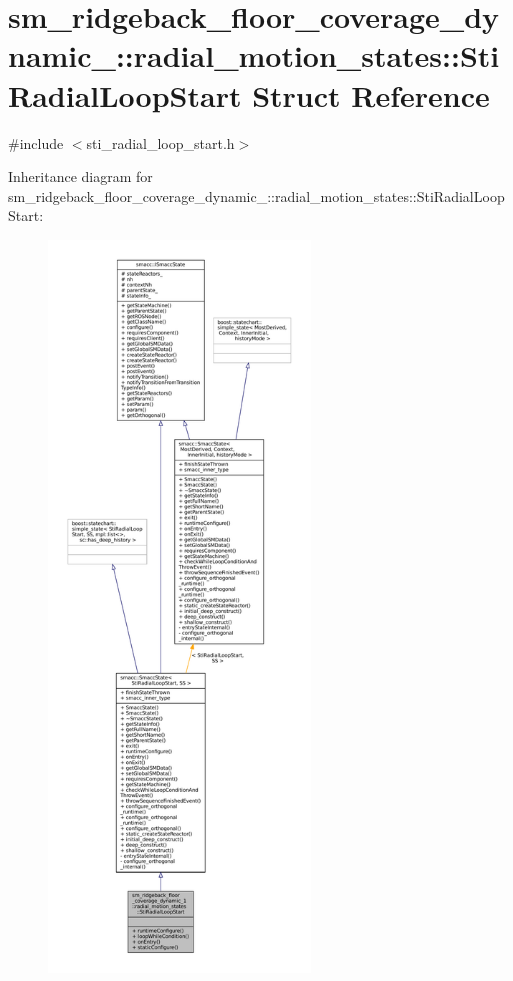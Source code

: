 \hypertarget{structsm__ridgeback__floor__coverage__dynamic__1_1_1radial__motion__states_1_1StiRadialLoopStart}{}\section{sm\+\_\+ridgeback\+\_\+floor\+\_\+coverage\+\_\+dynamic\+\_\+:\+:radial\+\_\+motion\+\_\+states\+:\+:Sti\+Radial\+Loop\+Start Struct Reference}
\label{structsm__ridgeback__floor__coverage__dynamic__1_1_1radial__motion__states_1_1StiRadialLoopStart}


{\ttfamily \#include $<$sti\+\_\+radial\+\_\+loop\+\_\+start.\+h$>$}



Inheritance diagram for sm\+\_\+ridgeback\+\_\+floor\+\_\+coverage\+\_\+dynamic\+\_\+:\+:radial\+\_\+motion\+\_\+states\+:\+:Sti\+Radial\+Loop\+Start\+:
\nopagebreak
\begin{figure}[H]
\begin{center}
\leavevmode
\includegraphics[height=550pt]{structsm__ridgeback__floor__coverage__dynamic__1_1_1radial__motion__states_1_1StiRadialLoopStart__inherit__graph}
\end{center}
\end{figure}



